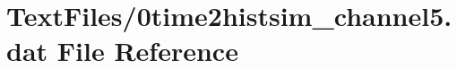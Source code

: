 \hypertarget{0time2histsim__channel5_8dat}{}\section{Text\+Files/0time2histsim\+\_\+channel5.dat File Reference}
\label{0time2histsim__channel5_8dat}
